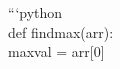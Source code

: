 \documentclass[preview]{standalone}
\begin{document}
```python\\def findmax(arr):\\maxval = arr[0]\\
\end{document}

